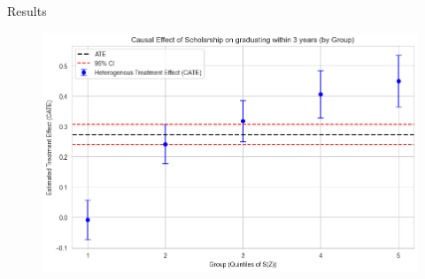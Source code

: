 \documentclass[aspectratio=169]{beamer}
\begin{document}
\begin{frame}{ Results}

\begin{figure}[h!]  
        \includegraphics[width=1\linewidth]{Tex_Pictures/HE_quintile_graduating.png} 

 
 \end{figure}   
\end{frame}
\end{document}
